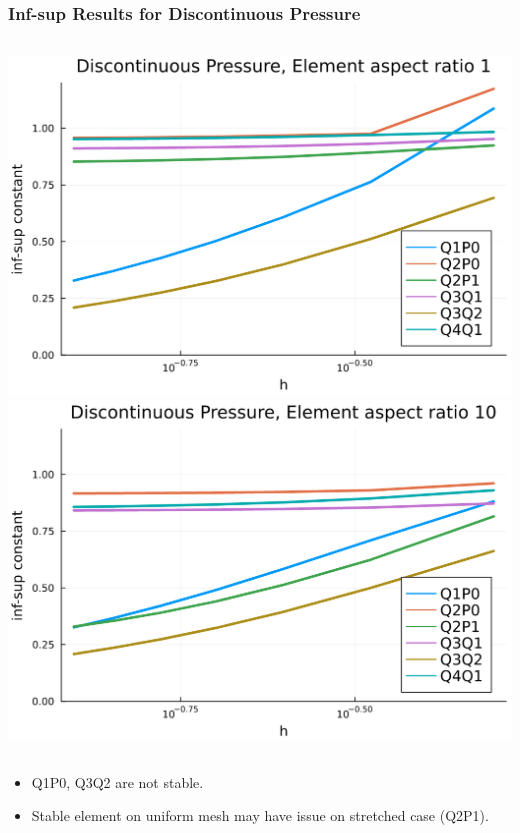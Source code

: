 \documentclass[aspectratio=169,xcolor=dvipsnames]{beamer}
\begin{document}

\begin{frame}
    \frametitle{Inf-sup Results for Discontinuous Pressure}
    \begin{columns}
        \centering
        \includegraphics[height =0.6\textheight]{figures/dist-p-1.png}
        \centering
        \includegraphics[height =0.6\textheight]{figures/dist-p-10.png}
    \end{columns}

\vspace*{5pt}
\begin{itemize}
    \item Q1P0, Q3Q2 are not stable.
    \item Stable element on uniform mesh may have issue on stretched case (Q2P1).
\end{itemize}

\end{frame}
\end{document}
